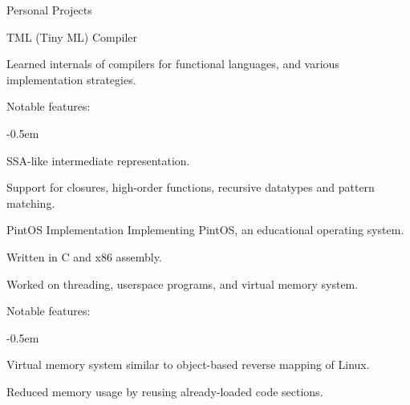 \documentclass{resume}
\begin{document}
\begin{res-section}{Personal Projects}
\begin{res-subsection}{TML (Tiny ML) Compiler}{}
    \item Learned internals of compilers for functional languages, and various implementation strategies.

    \item Notable features:
    \vspace{-0.5em}
    \begin{list}{--}{}
      \itemsep -0.5em
      \item SSA-like intermediate representation.
      \item Support for closures, high-order functions, recursive datatypes and pattern matching.
    \end{list}
  \end{res-subsection}

  \begin{res-subsection}{PintOS Implementation}{}
    Implementing PintOS, an educational operating system.

    \item Written in C and x86 assembly.

    \item Worked on threading, userspace programs, and virtual memory system.

    \item Notable features:
    \vspace{-0.5em}
    \begin{list}{--}{}
      \itemsep -0.5em
      \item Virtual memory system similar to object-based reverse mapping of Linux.
      \item Reduced memory usage by reusing already-loaded code sections.
    \end{list}
  \end{res-subsection}
\end{res-section}
\end{document}
